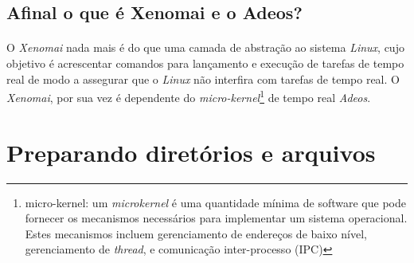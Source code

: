 \documentclass[a4paper,10pt]{article}
\begin{document}
  \subsection{Afinal o que é Xenomai e o Adeos?}
    \paragraph{}
      O \emph{Xenomai} nada mais é do que uma camada de abstração ao sistema \emph{Linux}, cujo objetivo é acrescentar comandos 
      para lançamento e execução de tarefas de tempo real de modo a assegurar que o \emph{Linux} não interfira com tarefas de tempo 
      real. O \emph{Xenomai}, por sua vez é dependente do \emph{micro-kernel}\footnote{micro-kernel: um \emph{microkernel} é uma quantidade 
      mínima de software que pode fornecer os mecanismos necessários para implementar um sistema operacional. Estes mecanismos incluem 
      gerenciamento de endereços de baixo nível, gerenciamento de \emph{thread}, e comunicação inter-processo (IPC)} de tempo real \emph{Adeos}.

\section{Preparando diretórios e arquivos}
\end{document}
